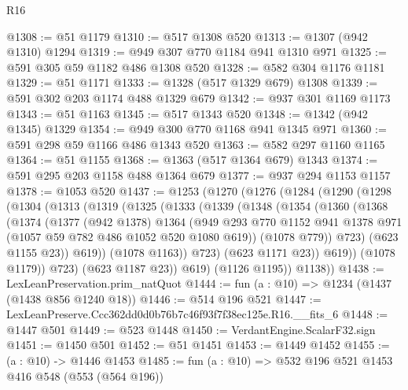\begin{lexlean}{R16}
\begin{coremodule}
@1308 := @51 @1179
@1310 := @517 @1308 @520
@1313 := @1307 (@942 @1310) @1294
@1319 := @949 @307 @770 @1184 @941 @1310 @971
@1325 := @591 @305 @59 @1182 @486 @1308 @520
@1328 := @582 @304 @1176 @1181
@1329 := @51 @1171
@1333 := @1328 (@517 @1329 @679) @1308
@1339 := @591 @302 @203 @1174 @488 @1329 @679
@1342 := @937 @301 @1169 @1173
@1343 := @51 @1163
@1345 := @517 @1343 @520
@1348 := @1342 (@942 @1345) @1329
@1354 := @949 @300 @770 @1168 @941 @1345 @971
@1360 := @591 @298 @59 @1166 @486 @1343 @520
@1363 := @582 @297 @1160 @1165
@1364 := @51 @1155
@1368 := @1363 (@517 @1364 @679) @1343
@1374 := @591 @295 @203 @1158 @488 @1364 @679
@1377 := @937 @294 @1153 @1157
@1378 := @1053 @520
@1437 := @1253
    (@1270
      (@1276
        (@1284
          (@1290
            (@1298
              (@1304
                (@1313
                  (@1319
                    (@1325
                      (@1333
                        (@1339
                          (@1348
                            (@1354
                              (@1360
                                (@1368
                                  (@1374
                                    (@1377
                                      (@942 @1378)
                                      @1364
                                      (@949
                                        @293
                                        @770
                                        @1152
                                        @941
                                        @1378
                                        @971
                                        (@1057 @59 @782 @486 @1052 @520 @1080 @619))
                                      (@1078 @779))
                                    @723)
                                  (@623 @1155 @23))
                                @619))
                            (@1078 @1163))
                          @723)
                        (@623 @1171 @23))
                      @619))
                  (@1078 @1179))
                @723)
              (@623 @1187 @23))
            @619)
          (@1126 @1195))
        @1138))
@1438 := LexLeanPreservation.prim_natQuot
@1444 := fun (a : @10) => @1234 (@1437 (@1438 @856 @1240 @18))
@1446 := @514 @196 @521
@1447 := LexLeanPreserve.Ccc362dd0d0b76b7c46f93f7f38ec125e.R16.__fits_6
@1448 := @1447 @501
@1449 := @523 @1448
@1450 := VerdantEngine.ScalarF32.sign
@1451 := @1450 @501
@1452 := @51 @1451
@1453 := @1449 @1452
@1455 := (a : @10) -> @1446 @1453
@1485 := fun (a : @10) =>
  @532
    @196
    @521
    @1453
    @416
    @548
    (@553 (@564 @196))

\end{coremodule}
\end{lexlean}
